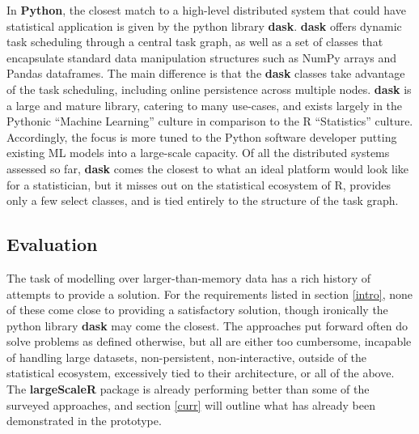 In \textbf{Python}, the closest match to a high-level distributed system that could have statistical application is given by the python library \textbf{dask}\cite{rocklin2015dask}.
\textbf{dask} offers dynamic task scheduling through a central task graph, as well as a set of classes that encapsulate standard data manipulation structures such as NumPy arrays and Pandas dataframes.
The main difference is that the \textbf{dask} classes take advantage of the task scheduling, including online persistence across multiple nodes.
\textbf{dask} is a large and mature library, catering to many use-cases, and exists largely in the Pythonic ``Machine Learning'' culture in comparison to the R ``Statistics'' culture.
Accordingly, the focus is more tuned to the Python software developer putting existing ML models into a large-scale capacity.
Of all the distributed systems assessed so far, \textbf{dask} comes the closest to what an ideal platform would look like for a statistician, but it misses out on the statistical ecosystem of R, provides only a few select classes, and is tied entirely to the structure of the task graph.

\subsection{Evaluation}

The task of modelling over larger-than-memory data has a rich history of attempts to provide a solution.
For the requirements listed in section \ref{intro}, none of these come close to providing a satisfactory solution, though ironically the python library \textbf{dask} may come the closest.
The approaches put forward often do solve problems as defined otherwise, but all are either too cumbersome, incapable of handling large datasets, non-persistent, non-interactive, outside of the statistical ecosystem, excessively tied to their architecture, or all of the above.
The \textbf{largeScaleR} package is already performing better than some of the surveyed approaches, and section \ref{curr} will outline what has already been demonstrated in the prototype.

